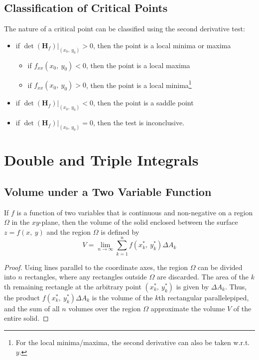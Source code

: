 \documentclass{article}
\begin{document}
\subsection{Classification of Critical Points}
The nature of a critical point can be classified using the second
derivative test:
\begin{itemize}
    \item if \(\left.\det{\left(\mathbf{H}_f\right)}\right|_{(x_0,\:
          y_0)} > 0\), then the point is a local minima or maxima
          \begin{itemize}
              \item if \(f_{xx}\left( x_0, \: y_0 \right) < 0\), then
                    the point is a local maxima
              \item if \(f_{xx}\left( x_0, \: y_0 \right) > 0\), then
                    the point is a local minima\footnote{For the local
                    minima/maxima, the second derivative can also be
                    taken w.r.t. \(y\).}
          \end{itemize}
    \item if \(\left.\det{\left(\mathbf{H}_f\right)}\right|_{(x_0,\:
          y_0)} < 0\), then the point is a saddle point
    \item if \(\left.\det{\left(\mathbf{H}_f\right)}\right|_{(x_0,\:
          y_0)} = 0\), then the test is inconclusive.
\end{itemize}
\newpage
\section{Double and Triple Integrals}
\subsection{Volume under a Two Variable Function}
\begin{definition}
    If \(f\) is a function of two variables that is continuous and
    non-negative on a region \(\Omega\) in the \(xy\)-plane, then the
    volume of the solid enclosed between the surface \(z=f\left( x,\: y \right)\) and
    the region \(\Omega\) is defined by
    \begin{equation}
        \label{eq:volume_under_2d_function}
        V = \lim_{n \to \infty} \sum_{k = 1}^n f\left( x_k^\ast,\: y_k^\ast \right) \Delta A_k
    \end{equation}
\end{definition}
\begin{proof}
    Using lines parallel to the coordinate axes, the region \(\Omega\)
    can be divided into \(n\) rectangles, where any rectangles outside
    \(\Omega\) are discarded. The area of the \(k\)th remaining
    rectangle at the arbitrary point \(\left( x_k^\ast,\: y_k^\ast \right)\) is given
    by \(\Delta A_k\). Thus, the product
    \(f\left( x_k^\ast,\: y_k^\ast \right)\Delta A_k\) is the volume of the \(k\)th
    rectangular parallelepiped, and the sum of all \(n\) volumes over
    the region \(\Omega\) approximate the volume \(V\) of the entire
    solid.
\end{proof}
\end{document}
